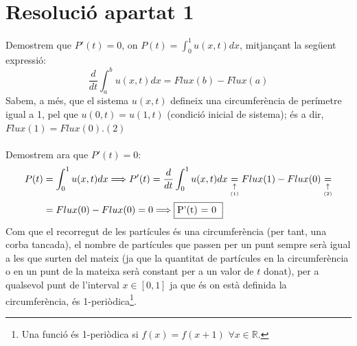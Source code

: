 \documentclass[a4paper, 11pt]{article}
\begin{document}
\section{Resolució apartat 1}
Demostrem que $P'(t) = 0$, on $P(t) = \int_0^1 u(x,t) dx$, mitjançant la següent expressió:
\begin{equation}
    \frac{d}{dt}\int_a^b u(x,t) dx = Flux(b)-Flux(a)
\end{equation}
Sabem, a més, que el sistema $u(x,t)$ defineix una circumferència de perímetre igual a 1, pel que $u(0,t) = u(1,t)$ (condició inicial de sistema); és a dir, $Flux(1)=Flux(0)$.\hfill $(2)$ \\\\
Demostrem ara que $P'(t) = 0$:
\begin{equation*}
\begin{split}
P(t) &  = \int_0^1 u(x,t) dx \Longrightarrow P'(t) = \frac{d}{dt}\int_0^1 u(x,t) dx \underset{\underset{(1)}{\uparrow}}{=} Flux(1)-Flux(0) \underset{\underset{(2)}{\uparrow}}{=} \\
& = Flux(0)-Flux(0) = 0 \Longrightarrow \fcolorbox{black}{white}{P'(t) = 0 }
\end{split}
\end{equation*}
Com que el recorregut de les partícules és una circumferència (per tant, una corba tancada), el nombre de partícules que passen per un punt sempre serà igual a les que surten del mateix (ja que la quantitat de partícules en la circumferència o en un punt de la mateixa serà constant per a un valor de $t$ donat), per a qualsevol punt de l'interval $x\in [0,1]$ ja que és on està definida la circumferència, és 1-periòdica\footnote{Una funció és 1-periòdica si $f(x) = f(x+1)$ $\forall x\in \mathbb{R}$. }.
\newpage
\end{document}
